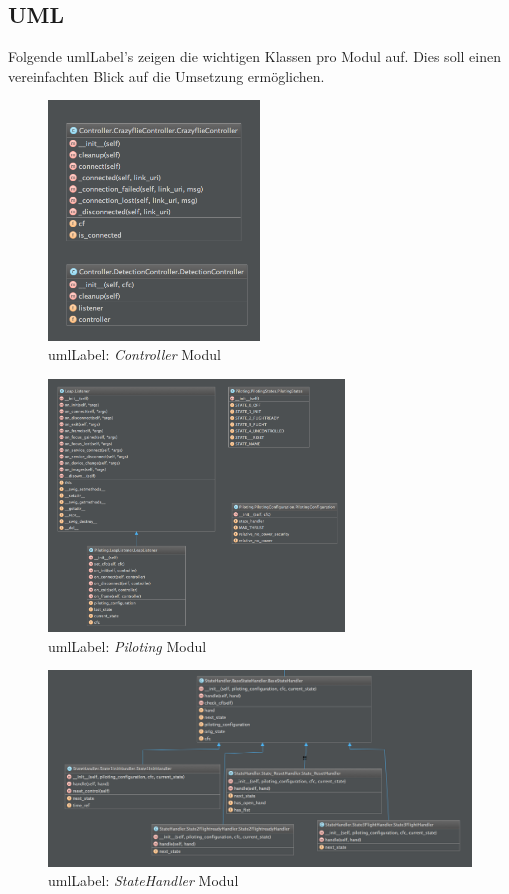 \subsection{UML}
Folgende \gls{umlLabel}'s zeigen die wichtigen Klassen pro Modul auf. Dies soll einen vereinfachten Blick auf die Umsetzung ermöglichen.

\begin{figure}[H]
	\centering
	\includegraphics[width=0.5\textwidth]{figures/poc/uml/controller.png}
	\caption{\gls{umlLabel}: \textit{Controller} Modul}
\end{figure}

\begin{figure}[H]
	\centering
	\includegraphics[width=0.7\textwidth]{figures/poc/uml/piloting.png}
	\caption{\gls{umlLabel}: \textit{Piloting} Modul}
\end{figure}

\begin{figure}[H]
	\centering
	\includegraphics[width=1.0\textwidth]{figures/poc/uml/stateHandler.png}
	\caption{\gls{umlLabel}: \textit{StateHandler} Modul}
\end{figure}


